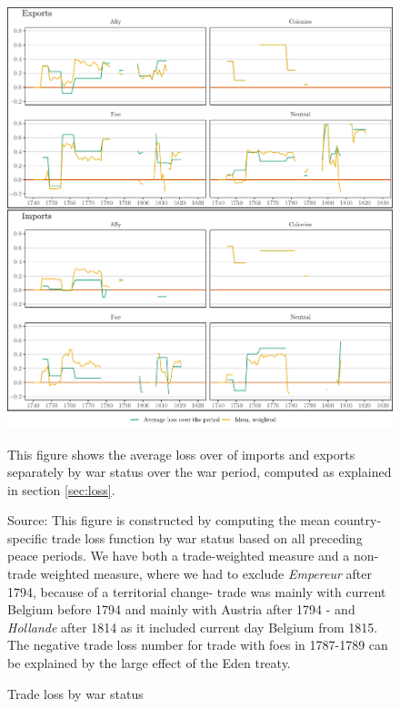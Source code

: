 \documentclass[12pt,a4paper,notitlepage,english]{article}
\newcommand{\fontsmall}{\fontsize{10pt}{12pt}\selectfont}
\newcommand{\source}[1]{\caption*{\footnotesize Source: {#1}} }
\begin{document}
\begin{appendix}
\begin{figure}[h!]
\centering
\caption{Trade loss by war status}
\label{fig:loss_by_war_status_X_I}
\includegraphics[scale=.2]{loss_by_war_status_X_I_combined}
\begin{minipage}{.95\textwidth}
\fontsmall 
This figure shows the average loss over of imports and exports separately by war status over the war period, computed as explained in section \ref{sec:loss}. 
\source{This figure is constructed by computing the mean country-specific trade loss function by war status based on all preceding peace periods.
We have both a trade-weighted measure and a non-trade weighted measure, where we had to exclude \textit{Empereur} after 1794, because of a territorial change- trade was mainly with current Belgium before 1794 and mainly with Austria after 1794 - and \textit{Hollande} after 1814 as it included current day Belgium from 1815.
The negative trade loss number for trade with foes in 1787-1789 can be explained by the large effect of the Eden treaty.}
\end{minipage}
\end{figure}





\end{appendix}
\end{document}

